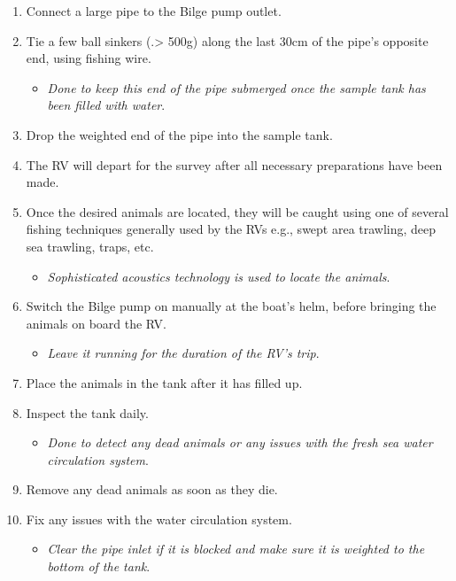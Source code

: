 \documentclass[
  letterpaper,
  DIV=11,
  numbers=noendperiod]{scrreprt}
\providecommand{\tightlist}{%
  \setlength{\itemsep}{0pt}\setlength{\parskip}{0pt}}\usepackage{longtable,booktabs,array}
\begin{document}
\begin{enumerate}
\def\labelenumi{\arabic{enumi}.}
\setcounter{enumi}{8}
\tightlist
\item
  Connect a large pipe to the Bilge pump outlet.
\item
  Tie a few ball sinkers (.\textgreater{} 500g) along the last 30cm of
  the pipe's opposite end, using fishing wire.

  \begin{itemize}
  \tightlist
  \item
    \emph{Done to keep this end of the pipe submerged once the sample
    tank has been filled with water}.
  \end{itemize}
\item
  Drop the weighted end of the pipe into the sample tank.
\item
  The RV will depart for the survey after all necessary preparations
  have been made.
\item
  Once the desired animals are located, they will be caught using one of
  several fishing techniques generally used by the RVs e.g., swept area
  trawling, deep sea trawling, traps, etc.

  \begin{itemize}
  \tightlist
  \item
    \emph{Sophisticated acoustics technology is used to locate the
    animals}.
  \end{itemize}
\item
  Switch the Bilge pump on manually at the boat's helm, before bringing
  the animals on board the RV.

  \begin{itemize}
  \tightlist
  \item
    \emph{Leave it running for the duration of the RV's trip}.
  \end{itemize}
\item
  Place the animals in the tank after it has filled up.
\item
  Inspect the tank daily.

  \begin{itemize}
  \tightlist
  \item
    \emph{Done to detect any dead animals or any issues with the fresh
    sea water circulation system}.
  \end{itemize}
\item
  Remove any dead animals as soon as they die.
\item
  Fix any issues with the water circulation system.

  \begin{itemize}
  \tightlist
  \item
    \emph{Clear the pipe inlet if it is blocked and make sure it is
    weighted to the bottom of the tank}.
  \end{itemize}
\end{enumerate}
\end{document}
